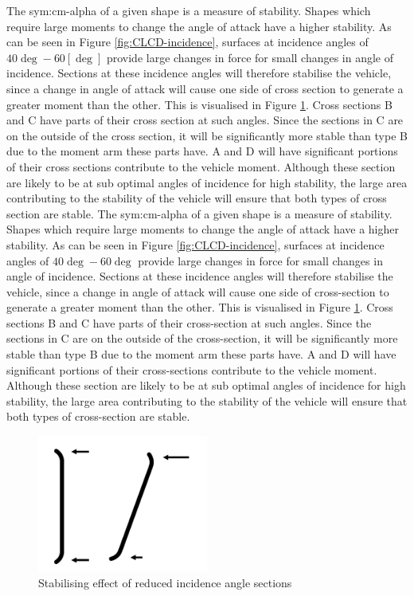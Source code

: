 The \gls{sym:cm-alpha} of a given shape is a measure of stability. Shapes which require large moments to change the angle of attack have a higher stability. As can be seen in Figure \ref{fig:CLCD-incidence}, surfaces at incidence angles of $40\deg-60[\deg]$ provide large changes in force for small changes in angle of incidence. Sections at these incidence angles will therefore stabilise the vehicle, since a change in angle of attack will cause one side of cross section to generate a greater moment than the other. This is visualised in Figure \ref{fig:StabMom}. Cross sections B and C have parts of their cross section at such angles. Since the sections in C are on the outside of the cross section, it will be significantly more stable than type B due to the moment arm these parts have. A and D will have significant portions of their cross sections contribute to the vehicle moment. Although these section are likely to be at sub optimal angles of incidence for high stability, the large area contributing to the stability of the vehicle will ensure that both types of cross section are stable. 
The \gls{sym:cm-alpha} of a given shape is a measure of stability. Shapes which require large moments to change the angle of attack have a higher stability. As can be seen in Figure \ref{fig:CLCD-incidence}, surfaces at incidence angles of $40\deg-60\deg$ provide large changes in force for small changes in angle of incidence. Sections at these incidence angles will therefore stabilise the vehicle, since a change in angle of attack will cause one side of cross-section to generate a greater moment than the other. This is visualised in Figure \ref{fig:StabMom}. Cross sections B and C have parts of their cross-section at such angles. Since the sections in C are on the outside of the cross-section, it will be significantly more stable than type B due to the moment arm these parts have. A and D will have significant portions of their cross-sections contribute to the vehicle moment. Although these section are likely to be at sub optimal angles of incidence for high stability, the large area contributing to the stability of the vehicle will ensure that both types of cross-section are stable. 

\begin{figure}[h]
	\centering
	\includegraphics[width=0.5\textwidth]{./Figure/Aerodynamics/StabilizeMoment.pdf}
	\caption{Stabilising effect of reduced incidence angle sections}
	\label{fig:StabMom}
\end{figure}


